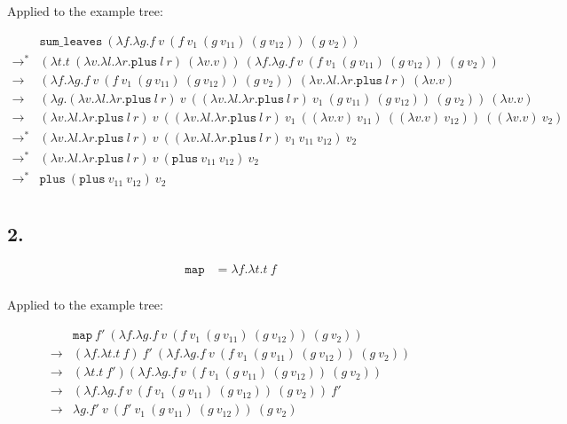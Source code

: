 \documentclass[13pt, a4paper]{article}
\begin{document}
Applied to the example tree:

\[
\begin{array}{llr}
& \texttt{sum\_leaves}\ (\lambda f.\lambda g.f\ v\ (f\ v_1\ (g\ v_{11})\ (g\ v_{12}))\ (g\ v_2)) \\
\to^* & (\lambda t.t\ (\lambda v.\lambda l. \lambda r.\texttt{plus}\ l\ r)\ (\lambda v.v))\ (\lambda f.\lambda g.f\ v\ (f\ v_1\ (g\ v_{11})\ (g\ v_{12}))\ (g\ v_2)) \\
\to & (\lambda f.\lambda g.f\ v\ (f\ v_1\ (g\ v_{11})\ (g\ v_{12}))\ (g\ v_2))\ (\lambda v.\lambda l. \lambda r.\texttt{plus}\ l\ r)\ (\lambda v.v) \\
\to & (\lambda g.(\lambda v.\lambda l. \lambda r.\texttt{plus}\ l\ r)\ v\ ((\lambda v.\lambda l. \lambda r.\texttt{plus}\ l\ r)\ v_1\ (g\ v_{11})\ (g\ v_{12}))\ (g\ v_2))\ (\lambda v.v) \\
\to & (\lambda v.\lambda l. \lambda r.\texttt{plus}\ l\ r)\ v\ ((\lambda v.\lambda l. \lambda r.\texttt{plus}\ l\ r)\ v_1\ ((\lambda v.v)\ v_{11})\ ((\lambda v.v)\ v_{12}))\ ((\lambda v.v)\ v_2) \\
\to^* & (\lambda v.\lambda l. \lambda r.\texttt{plus}\ l\ r)\ v\ ((\lambda v.\lambda l. \lambda r.\texttt{plus}\ l\ r)\ v_1\ v_{11}\ v_{12})\ v_2 \\
\to^* & (\lambda v.\lambda l. \lambda r.\texttt{plus}\ l\ r)\ v\ (\texttt{plus}\ v_{11}\ v_{12})\ v_2 \\
\to^* & \texttt{plus}\ (\texttt{plus}\ v_{11}\ v_{12})\ v_2 \\
\end{array}
\]


\subsection*{2.} %
\[
\begin{aligned}
\texttt{map} &= \lambda f.\lambda t.t\ f \\
\end{aligned}
\]

Applied to the example tree:

\[
\begin{array}{llr}
& \texttt{map}\ f'\ (\lambda f.\lambda g.f\ v\ (f\ v_1\ (g\ v_{11})\ (g\ v_{12}))\ (g\ v_2)) \\
\to & (\lambda f.\lambda t.t\ f)\ f'\ (\lambda f.\lambda g.f\ v\ (f\ v_1\ (g\ v_{11})\ (g\ v_{12}))\ (g\ v_2)) \\
\to & (\lambda t.t\ f') (\lambda f.\lambda g.f\ v\ (f\ v_1\ (g\ v_{11})\ (g\ v_{12}))\ (g\ v_2)) \\
\to & (\lambda f.\lambda g.f\ v\ (f\ v_1\ (g\ v_{11})\ (g\ v_{12}))\ (g\ v_2))\ f' \\
\to & \lambda g.f'\ v\ (f'\ v_1\ (g\ v_{11})\ (g\ v_{12}))\ (g\ v_2) \\
\end{array}
\]
\end{document}
